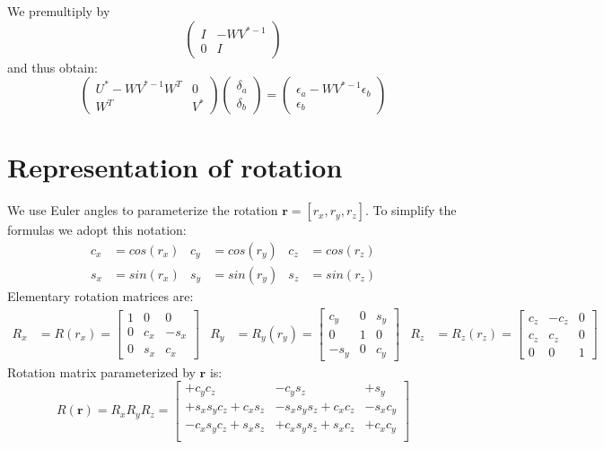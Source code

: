 \documentclass[10pt]{article}         %
\begin{document}
We premultiply by
\begin{equation}
  \begin{pmatrix}
    I &-WV^{*-1}\\
    0 &I
  \end{pmatrix}
\end{equation}
and thus obtain:
\begin{equation}
  \begin{pmatrix}
    U^*-WV^{*-1}W^T& 0\\
    W^T& V^*
  \end{pmatrix}
  \begin{pmatrix}\delta_a\\ \delta_b\end{pmatrix} = 
  \begin{pmatrix}\epsilon_a - WV^{*-1}\epsilon_b\\ \epsilon_b\end{pmatrix}
\end{equation}


\section{Representation of rotation}
\label{sec: rot_mat}
We use Euler angles to parameterize the rotation $\mathbf{r} = [r_x,r_y,r_z]$. To simplify the formulas we adopt this notation:
\begin{align*}
  c_x &= cos(r_x) & c_y &= cos(r_y) & c_z&=cos(r_z) \\
  s_x &= sin(r_x) & s_y &= sin(r_y) & s_z&=sin(r_z)
\end{align*}
Elementary rotation matrices are:
\begin{align*}
R_x&= R(r_x) = 
\begin{bmatrix}
1& 0& 0\\
0& c_x& -s_x\\
0& s_x& c_x
\end{bmatrix} & R_y&=R_y(r_y) = \begin{bmatrix}
c_y& 0& s_y\\
0& 1& 0\\
-s_y& 0& c_y
\end{bmatrix} &R_z &= R_z(r_z) = \begin{bmatrix}
c_z& -c_z& 0\\
c_z& c_z& 0\\
0& 0& 1
\end{bmatrix}
\end{align*}
Rotation matrix parameterized by $\mathbf{r}$ is:
\[
R(\mathbf{r}) = R_xR_yR_z =
\begin{bmatrix}
 +c_yc_z& -c_ys_z& +s_y\\
 +s_xs_yc_z+c_xs_z& -s_xs_ys_z+c_xc_z& -s_xc_y\\
 -c_xs_yc_z+s_xs_z& +c_xs_ys_z+s_xc_z& +c_xc_y\\
\end{bmatrix}
\]
\end{document}
